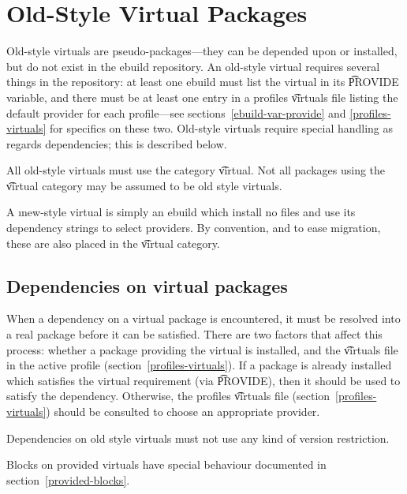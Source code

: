 \chapter{Old-Style Virtual Packages}
\label{old-virtuals}

Old-style virtuals are pseudo-packages---they can be depended upon or
installed, but do not exist in the ebuild repository.  An old-style
virtual requires several things in the repository: at least one ebuild
must list the virtual in its \t{PROVIDE} variable, and there must be
at least one entry in a profiles \t{virtuals} file listing the default
provider for each profile---see sections~\ref{ebuild-var-provide} and
\ref{profiles-virtuals} for specifics on these two. Old-style virtuals
require special handling as regards dependencies; this is described
below.

All old-style virtuals must use the category \t{virtual}. Not all packages using the \t{virtual}
category may be assumed to be old style virtuals.

\note A \i{new-style} virtual is simply an ebuild which install no files and use its dependency
strings to select providers. By convention, and to ease migration, these are also placed in the
\t{virtual} category.

\section{Dependencies on virtual packages}

When a dependency on a virtual package is encountered, it must be
resolved into a real package before it can be satisfied. There are two
factors that affect this process: whether a package providing the
virtual is installed, and the \t{virtuals} file in the active profile
(section~\ref{profiles-virtuals}). If a package is already installed
which satisfies the virtual requirement (via \t{PROVIDE}), then it
should be used to satisfy the dependency. Otherwise, the profiles
\t{virtuals} file (section~\ref{profiles-virtuals}) should be
consulted to choose an appropriate provider.

Dependencies on old style virtuals must not use any kind of version restriction.

Blocks on provided virtuals have special behaviour documented in section~\ref{provided-blocks}.


